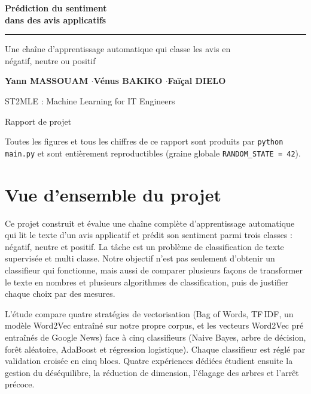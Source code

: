 \documentclass[11pt,a4paper]{article}
\newcommand{\sectionrule}{\textcolor{accent}{\rule{\linewidth}{1.2pt}}}
\begin{document}
\begin{titlepage}
\centering
\vspace*{2.2cm}
{\color{primary}\Huge\bfseries Prédiction du sentiment\\[0.3cm] dans des avis applicatifs\par}
\vspace{0.6cm}
\sectionrule\par
\vspace{0.6cm}
{\Large Une chaîne d'apprentissage automatique qui classe les avis en\\
négatif, neutre ou positif\par}
\vspace{2.2cm}
{\large\bfseries Yann MASSOUAM \quad$\cdot$\quad Vénus BAKIKO \quad$\cdot$\quad Faïçal DIELO\par}
\vspace{0.8cm}
{\large ST2MLE : Machine Learning for IT Engineers\par}
\vspace{0.4cm}
{\large Rapport de projet\par}
\vfill
{\small Toutes les figures et tous les chiffres de ce rapport sont produits par
\texttt{python main.py} et sont entièrement reproductibles (graine globale
\texttt{RANDOM\_STATE = 42}).\par}
\end{titlepage}

\section{Vue d'ensemble du projet}
Ce projet construit et évalue une chaîne complète d'apprentissage automatique qui lit
le texte d'un avis applicatif et prédit son sentiment parmi trois classes : négatif,
neutre et positif. La tâche est un problème de classification de texte supervisée et
multi classe. Notre objectif n'est pas seulement d'obtenir un classifieur qui
fonctionne, mais aussi de comparer plusieurs façons de transformer le texte en nombres
et plusieurs algorithmes de classification, puis de justifier chaque choix par des
mesures.

L'étude compare quatre stratégies de vectorisation (Bag of Words, TF\,IDF, un modèle
Word2Vec entraîné sur notre propre corpus, et les vecteurs Word2Vec pré entraînés de
Google News) face à cinq classifieurs (Naive Bayes, arbre de décision, forêt
aléatoire, AdaBoost et régression logistique). Chaque classifieur est réglé par
validation croisée en cinq blocs. Quatre expériences dédiées étudient ensuite la
gestion du déséquilibre, la réduction de dimension, l'élagage des arbres et l'arrêt
précoce.
\end{document}
